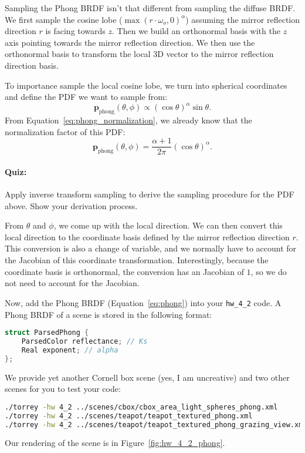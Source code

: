 Sampling the Phong BRDF isn't that different from sampling the diffuse BRDF. We first sample the cosine lobe ($\max\left(r \cdot \omega_o, 0\right)^\alpha$) assuming the mirror reflection direction $r$ is facing towards $z$. Then we build an orthonormal basis with the $z$ axis pointing towards the mirror reflection direction. We then use the orthonormal basis to transform the local 3D vector to the mirror reflection direction basis.

To importance sample the local cosine lobe, we turn into spherical coordinates and define the PDF we want to sample from:
\begin{equation}
\mathbf{p}_{\text{phong}}(\theta, \phi) \propto \left(\cos\theta\right)^{\alpha} \sin\theta.
\end{equation}
From Equation~\eqref{eq:phong_normalization}, we already know that the normalization factor of this PDF:
\begin{equation}
\mathbf{p}_{\text{phong}}(\theta, \phi) = \frac{\alpha + 1}{2\pi}\left(\cos\theta\right)^{\alpha}.
\end{equation}

\paragraph{Quiz:} Apply inverse transform sampling to derive the sampling procedure for the PDF above. Show your derivation process.

From $\theta$ and $\phi$, we come up with the local direction. We can then convert this local direction to the coordinate basis defined by the mirror reflection direction $r$. This conversion is also a change of variable, and we normally have to account for the Jacobian of this coordinate transformation. Interestingly, because the coordinate basis is orthonormal, the conversion has an Jacobian of $1$, so we do not need to account for the Jacobian.

Now, add the Phong BRDF (Equation~\eqref{eq:phong}) into your \lstinline{hw_4_2} code. A Phong BRDF of a scene is stored in the following format:
\begin{lstlisting}[language=C++]
struct ParsedPhong {
    ParsedColor reflectance; // Ks
    Real exponent; // alpha
};
\end{lstlisting}

We provide yet another Cornell box scene (yes, I am uncreative) and two other scenes for you to test your code:
\begin{lstlisting}[language=bash]
./torrey -hw 4_2 ../scenes/cbox/cbox_area_light_spheres_phong.xml
./torrey -hw 4_2 ../scenes/teapot/teapot_textured_phong.xml
./torrey -hw 4_2 ../scenes/teapot/teapot_textured_phong_grazing_view.xml
\end{lstlisting}
Our rendering of the scene is in Figure~\ref{fig:hw_4_2_phong}.

